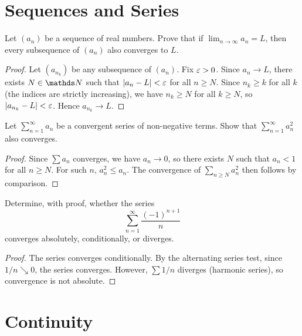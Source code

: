 \documentclass[12pt]{article}
\begin{document}

\section{Sequences and Series}

\begin{problem}
  Let \((a_n)\) be a sequence of real numbers.
  Prove that if \(\lim_{n \to \infty} a_n = L\), then every subsequence of \((a_n)\)
  also converges to \(L\).
\end{problem}

\begin{proof}
  Let \((a_{n_k})\) be any subsequence of \((a_n)\).
  Fix \(\varepsilon > 0\).
  Since \(a_n \to L\), there exists \(N \in \NN\) such that \(\lvert a_n - L\rvert < \varepsilon\)
  for all \(n \geq N\).
  Since \(n_k \geq k\) for all \(k\) (the indices are strictly increasing), we have
  \(n_k \geq N\) for all \(k \geq N\), so \(\lvert a_{n_k} - L\rvert < \varepsilon\).
  Hence \(a_{n_k} \to L\).
\end{proof}

\begin{problem}
  Let \(\sum_{n=1}^{\infty} a_n\) be a convergent series of non-negative terms.
  Show that \(\sum_{n=1}^{\infty} a_n^2\) also converges.
\end{problem}

\begin{proof}
  Since \(\sum a_n\) converges, we have \(a_n \to 0\), so there exists \(N\) such that
  \(a_n < 1\) for all \(n \geq N\).
  For such \(n\), \(a_n^2 \leq a_n\).
  The convergence of \(\sum_{n \geq N} a_n^2\) then follows by comparison.
\end{proof}

\begin{problem}
  Determine, with proof, whether the series
  \[
    \sum_{n=1}^{\infty} \frac{(-1)^{n+1}}{n}
  \]
  converges absolutely, conditionally, or diverges.
\end{problem}

\begin{proof}
  The series converges conditionally.
  By the alternating series test, since \(1/n \searrow 0\), the series converges.
  However, \(\sum 1/n\) diverges (harmonic series), so convergence is not absolute.
\end{proof}


\section{Continuity}
\end{document}

